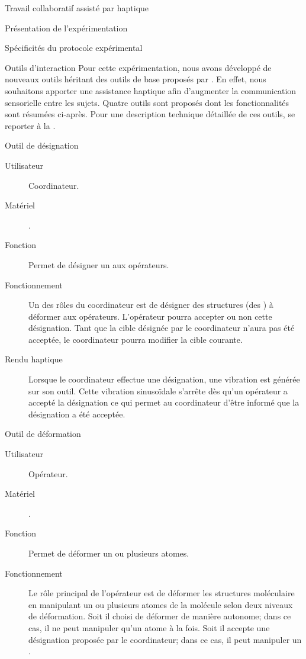 \documentclass[myfrancais,ngerman,english,french]{mythesis}
\begin{document}
\begin{mychapter}{Travail collaboratif assisté par haptique}
\begin{mysection}{Présentation de l'expérimentation}
\begin{mysubsection}{Spécificités du protocole expérimental}
\begin{mysubsubsection}{Outils d'interaction}
					Pour cette expérimentation, nous avons développé de nouveaux outils héritant des outils de base proposés par .
					En effet, nous souhaitons apporter une assistance haptique afin d'augmenter la communication sensorielle entre les sujets.
					Quatre outils sont proposés dont les fonctionnalités sont résumées ci-après.
					Pour une description technique détaillée de ces outils, se reporter à la .
					\begin{myparagraph}{Outil de désignation}
						\begin{description}
							\item[Utilisateur] Coordinateur.
							\item[Matériel] \myOmni.
							\item[Fonction] Permet de désigner un  aux opérateurs.
							\item[Fonctionnement]
								Un des rôles du coordinateur est de désigner des structures (des ) à déformer aux opérateurs.
								L'opérateur pourra accepter ou non cette désignation.
								Tant que la cible désignée par le coordinateur n'aura pas été acceptée, le coordinateur pourra modifier la cible courante.
							\item[Rendu haptique]
								Lorsque le coordinateur effectue une désignation, une vibration est générée sur son outil.
								Cette vibration sinusoïdale s'arrête dès qu'un opérateur a accepté la désignation ce qui permet au coordinateur d'être informé que la désignation a été acceptée.
						\end{description}
					\end{myparagraph}
					\begin{myparagraph}{Outil de déformation}
						\begin{description}
							\item[Utilisateur] Opérateur.
							\item[Matériel] \myOmni.
							\item[Fonction] Permet de déformer un ou plusieurs atomes.
							\item[Fonctionnement]
								Le rôle principal de l'opérateur est de déformer les structures moléculaire en manipulant un ou plusieurs atomes de la molécule selon deux niveaux de déformation.
								Soit il choisi de déformer de manière autonome; dans ce cas, il ne peut manipuler qu'un atome à la fois.
								Soit il accepte une désignation proposée par le coordinateur; dans ce cas, il peut manipuler un .

\end{description}
\end{myparagraph}
\end{mysubsubsection}
\end{mysubsection}
\end{mysection}
\end{mychapter}
\end{document}
